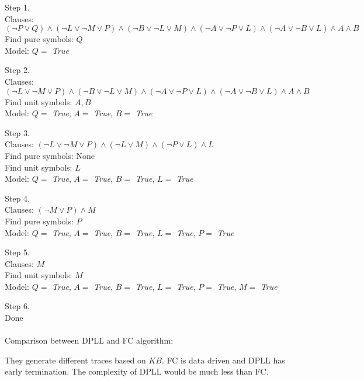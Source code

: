 \documentclass{article}
\begin{document}
\begin{enumerate}
Step 1. \\
Clauses: $(\neg P \lor Q) \land (\neg L \lor \neg M \lor P) \land (\neg B \lor \neg L \lor M) \land (\neg A \lor \neg P \lor L) \land (\neg A \lor \neg B \lor L) \land A \land B$ \\
Find pure symbols: $Q$ \\
Model: $Q=$ \textit{True}

Step 2. \\
Clauses: $(\neg L \lor \neg M \lor P) \land (\neg B \lor \neg L \lor M) \land (\neg A \lor \neg P \lor L) \land (\neg A \lor \neg B \lor L) \land A \land B$ \\
Find unit symbols: $A,B$ \\
Model: $Q=$ \textit{True}, $A=$ \textit{True}, $B=$ \textit{True}

Step 3. \\
Clauses: $(\neg L \lor \neg M \lor P) \land (\neg L \lor M) \land (\neg P \lor L) \land L$ \\
Find pure symbols: None \\
Find unit symbols: $L$ \\
Model: $Q=$ \textit{True}, $A=$ \textit{True}, $B=$ \textit{True}, $L=$ \textit{True}

Step 4. \\
Clauses: $(\neg M \lor P) \land M$ \\
Find pure symbols: $P$ \\
Model: $Q=$ \textit{True}, $A=$ \textit{True}, $B=$ \textit{True}, $L=$ \textit{True}, $P=$ \textit{True}

Step 5. \\
Clauses: $M$ \\
Find unit symbols: $M$ \\
Model: $Q=$ \textit{True}, $A=$ \textit{True}, $B=$ \textit{True}, $L=$ \textit{True}, $P=$ \textit{True}, $M=$ \textit{True}

Step 6. \\
Done
\\
\\
Comparison between DPLL and FC algorithm:

They generate different traces based on $KB$. FC is data driven and DPLL has early termination. The complexity of DPLL would be much less than FC.


\end{enumerate}


\newpage
\end{document}
